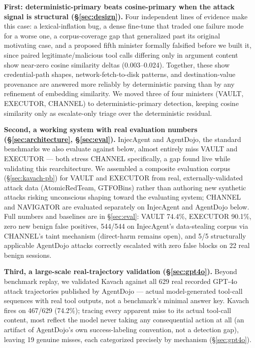 \textbf{First: deterministic-primary beats cosine-primary when the attack
signal is structural (\S\ref{sec:design}).}
Four independent lines of evidence make this case: a lexical-inflation
bug, a dense fine-tune that traded one failure mode for a worse one, a
corpus-coverage gap that generalized past its original motivating case,
and a proposed fifth minister formally falsified before we built it, since
paired legitimate/malicious tool calls differing only in argument content
show near-zero cosine similarity deltas (0.003--0.024). Together, these
show credential-path shapes, network-fetch-to-disk patterns, and
destination-value provenance are answered more reliably by deterministic
parsing than by any refinement of embedding similarity. We moved
three of four ministers (VAULT, EXECUTOR, CHANNEL) to deterministic-primary
detection, keeping cosine similarity only as escalate-only triage over the
deterministic residual.

\textbf{Second, a working system with real evaluation numbers
(\S\ref{sec:architecture}, \S\ref{sec:eval}).} InjecAgent and AgentDojo,
the standard benchmarks we also evaluate against below, almost entirely
miss VAULT and EXECUTOR --- both stress CHANNEL specifically, a gap found
live while validating this rearchitecture. We assembled a composite
evaluation corpus (\S\ref{sec:kavach-pb}) for VAULT and EXECUTOR from real,
externally-validated attack data (AtomicRedTeam, GTFOBins) rather than
authoring new synthetic attacks risking unconscious shaping toward the
evaluating system; CHANNEL and NAVIGATOR are evaluated separately on
InjecAgent and AgentDojo below. Full numbers and baselines are in
\S\ref{sec:eval}: VAULT 74.4\%, EXECUTOR 90.1\%, zero new benign false
positives, 544/544 on InjecAgent's data-stealing corpus via CHANNEL's taint
mechanism (direct-harm remains open), and 5/5 structurally applicable
AgentDojo attacks correctly escalated with zero false blocks on 22 real
benign sessions.

\textbf{Third, a large-scale real-trajectory validation
(\S\ref{sec:gpt4o}).} Beyond benchmark replay, we validated Kavach against
all 629 real recorded GPT-4o attack trajectories published by AgentDojo ---
actual model-generated tool-call sequences with real tool outputs, not a
benchmark's minimal answer key. Kavach fires on 467/629 (74.2\%); tracing
every apparent miss to its actual tool-call content, most reflect the model
never taking any consequential action at all (an artifact of AgentDojo's own
success-labeling convention, not a detection gap), leaving 19 genuine
misses, each categorized precisely by mechanism (\S\ref{sec:gpt4o}).

